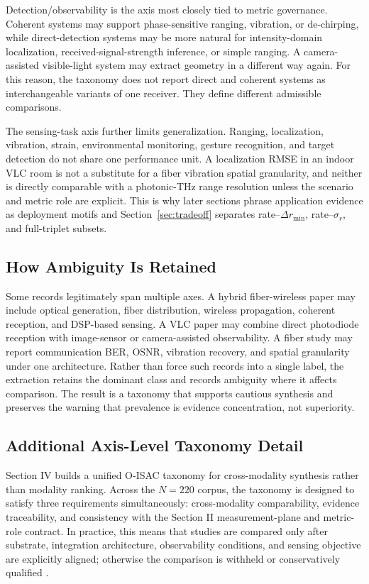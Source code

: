 \documentclass[letterpaper,journal]{IEEEtran}
\begin{document}
Detection/observability is the axis most closely tied to metric governance. Coherent systems may support phase-sensitive ranging, vibration, or de-chirping, while direct-detection systems may be more natural for intensity-domain localization, received-signal-strength inference, or simple ranging. A camera-assisted visible-light system may extract geometry in a different way again. For this reason, the taxonomy does not report direct and coherent systems as interchangeable variants of one receiver. They define different admissible comparisons.

The sensing-task axis further limits generalization. Ranging, localization, vibration, strain, environmental monitoring, gesture recognition, and target detection do not share one performance unit. A localization RMSE in an indoor VLC room is not a substitute for a fiber vibration spatial granularity, and neither is directly comparable with a photonic-THz range resolution unless the scenario and metric role are explicit. This is why later sections phrase application evidence as deployment motifs and Section~\ref{sec:tradeoff} separates rate--\(\Delta r_{\min}\), rate--\(\sigma_r\), and full-triplet subsets.

\subsection{How Ambiguity Is Retained}

Some records legitimately span multiple axes. A hybrid fiber-wireless paper may include optical generation, fiber distribution, wireless propagation, coherent reception, and DSP-based sensing. A VLC paper may combine direct photodiode reception with image-sensor or camera-assisted observability. A fiber study may report communication BER, OSNR, vibration recovery, and spatial granularity under one architecture. Rather than force such records into a single label, the extraction retains the dominant class and records ambiguity where it affects comparison. The result is a taxonomy that supports cautious synthesis and preserves the warning that prevalence is evidence concentration, not superiority.

\subsection{Additional Axis-Level Taxonomy Detail}

Section IV builds a unified O-ISAC taxonomy for cross-modality synthesis rather than modality ranking. Across the $N=220$ corpus, the taxonomy is designed to satisfy three requirements simultaneously: cross-modality comparability, evidence traceability, and consistency with the Section II measurement-plane and metric-role contract. In practice, this means that studies are compared only after substrate, integration architecture, observability conditions, and sensing objective are explicitly aligned; otherwise the comparison is withheld or conservatively qualified .
\end{document}
